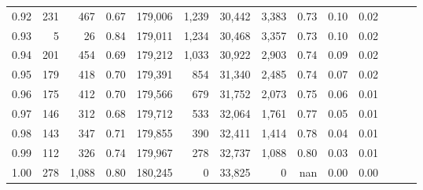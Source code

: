 \begin{tabular}{rrrrrrrrrrrrrr}
0.92 &    231 &    467 &  0.67 &  179,006 &    1,239 &  30,442 &   3,383 &  0.73 &  0.10 &      0.02 \\
0.93 &      5 &     26 &  0.84 &  179,011 &    1,234 &  30,468 &   3,357 &  0.73 &  0.10 &      0.02 \\
0.94 &    201 &    454 &  0.69 &  179,212 &    1,033 &  30,922 &   2,903 &  0.74 &  0.09 &      0.02 \\
0.95 &    179 &    418 &  0.70 &  179,391 &      854 &  31,340 &   2,485 &  0.74 &  0.07 &      0.02 \\
0.96 &    175 &    412 &  0.70 &  179,566 &      679 &  31,752 &   2,073 &  0.75 &  0.06 &      0.01 \\
0.97 &    146 &    312 &  0.68 &  179,712 &      533 &  32,064 &   1,761 &  0.77 &  0.05 &      0.01 \\
0.98 &    143 &    347 &  0.71 &  179,855 &      390 &  32,411 &   1,414 &  0.78 &  0.04 &      0.01 \\
0.99 &    112 &    326 &  0.74 &  179,967 &      278 &  32,737 &   1,088 &  0.80 &  0.03 &      0.01 \\
1.00 &    278 &  1,088 &  0.80 &  180,245 &        0 &  33,825 &       0 &   nan &  0.00 &      0.00 \\
\bottomrule
\end{tabular}
